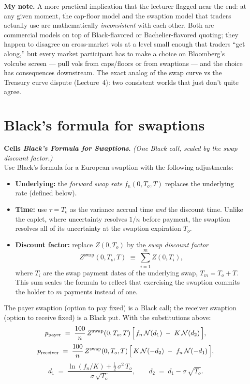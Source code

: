 \begin{checkpoint}
\textbf{My note.} A more practical implication that the lecturer
flagged near the end: at any given moment, the cap-floor model and
the swaption model that traders actually use are mathematically
\emph{inconsistent} with each other. Both are commercial models on
top of Black-flavored or Bachelier-flavored quoting; they happen to
disagree on cross-market vols at a level small enough that traders
``get along,'' but every market participant has to make a choice on
Bloomberg's volcube screen --- pull vols from caps/floors or from
swaptions --- and the choice has consequences downstream. The exact
analog of the swap curve vs the Treasury curve dispute (Lecture~4):
two consistent worlds that just don't quite agree.
\end{checkpoint}

\section{Black's formula for swaptions}\label{L6-sec:swaption-black}

\begin{keyblock}
\textbf{Cells \emph{Black's Formula for Swaptions}.}
\emph{(One Black call, scaled by the swap discount factor.)}\\
Use Black's formula for a European swaption with the following
adjustments:
\begin{itemize}
  \item \textbf{Underlying:} the \emph{forward swap rate}
        $f_n(0, T_o, T)$ replaces the underlying rate (defined
        below).
  \item \textbf{Time:} use $\tau = T_o$ as the variance accrual time
        \emph{and} the discount time. Unlike the caplet, where
        uncertainty resolves $1/n$ before payment, the swaption
        resolves all of its uncertainty at the swaption expiration
        $T_o$.
  \item \textbf{Discount factor:} replace $Z(0, T_o)$ by the
        \emph{swap discount factor}
        \[
          Z^{\text{swap}}(0, T_o, T) \;\equiv\; \sum_{i = 1}^{m} Z(0, T_i),
        \]
        where $T_i$ are the swap payment dates of the underlying
        swap, $T_m = T_o + T$. This sum scales the formula to
        reflect that exercising the swaption commits the holder to
        $m$ payments instead of one.
\end{itemize}
The payer swaption (option to pay fixed) is a Black call;
the receiver swaption (option to receive fixed) is a Black put. With
the substitutions above:
\[
  p_{\text{payer}} \;=\; \frac{100}{n}\,Z^{\text{swap}}(0, T_o, T)\,
        \Bigl[\, f_n\,\mathcal{N}(d_1) \;-\; K\,\mathcal{N}(d_2)\,\Bigr],
\]
\[
  p_{\text{receiver}} \;=\; \frac{100}{n}\,Z^{\text{swap}}(0, T_o, T)\,
        \Bigl[\, K\,\mathcal{N}(-d_2) \;-\; f_n\,\mathcal{N}(-d_1)\,\Bigr],
\]
\[
  d_1 \;=\; \frac{\ln(f_n / K) + \tfrac{1}{2}\,\sigma^2\,T_o}{\sigma\,\sqrt{T_o}},
  \qquad
  d_2 \;=\; d_1 - \sigma\,\sqrt{T_o}.
\]
\end{keyblock}

